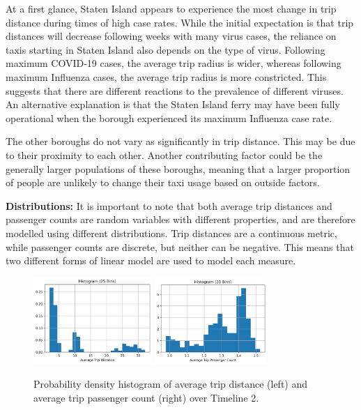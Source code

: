 \documentclass[11pt]{article}
\begin{document}
At a first glance, Staten Island appears to experience the most change in trip distance during times of high case rates.
While the initial expectation is that trip distances will decrease following weeks with many virus cases,
the reliance on taxis starting in Staten Island also depends on the type of virus.
Following maximum COVID-19 cases, the average trip radius is wider, 
whereas following maximum Influenza cases, the average trip radius is more constricted.
This suggests that there are different reactions to the prevalence of different viruses.
An alternative explanation is that the Staten Island ferry may have been fully operational when the borough experienced its maximum Influenza case rate.

The other boroughs do not vary as significantly in trip distance.
This may be due to their proximity to each other.
Another contributing factor could be the generally larger populations of these boroughs,
meaning that a larger proportion of people are unlikely to change their taxi usage based on outside factors.


\textbf{Distributions:} 
It is important to note that both average trip distances and passenger counts 
are random variables with different properties, and are therefore modelled using different distributions.
Trip distances are a continuous metric, while passenger counts are discrete, but neither can be negative.
This means that two different forms of linear model are used to model each measure.

\begin{figure}[H]
    \includegraphics[width=0.40\textwidth]{../plots/histogram-Average Trip Distance-25-bins.png}
    \includegraphics[width=0.38\textwidth]{../plots/histogram-Average Trip Passenger Count-20-bins.png}
    \centering
    \caption{Probability density histogram of average trip distance (left) and average trip passenger count (right) over Timeline 2.} %
    \label{fig:hists}
\end{figure}
\end{document}
